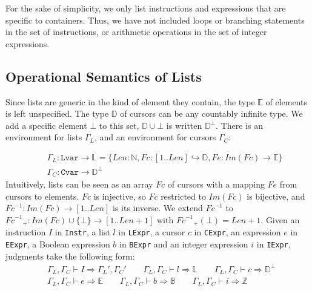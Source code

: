 \documentclass[runningheads,a4paper]{llncs}
\newcommand{\envL}{\ensuremath{\Gamma_L}\xspace}
\newcommand{\envC}{\ensuremath{\Gamma_C}\xspace}
\newcommand{\eval}{\envL, \envC \vdash}
\newcommand{\Fc}{\ensuremath{\mathit{Fc}}\xspace}
\newcommand{\FcInv}{\ensuremath{\mathit{Fc}^{-1}}\xspace}
\newcommand{\Fe}{\ensuremath{\mathit{Fe}}\xspace}
\newcommand{\ImFc}{\ensuremath{\mathit{Im}(\Fc)}\xspace}
\newcommand{\TypL}{\ensuremath{\mathbb{L}}\xspace}
\newcommand{\TypE}{\ensuremath{\mathbb{E}}\xspace}
\newcommand{\TypD}{\ensuremath{\mathbb{D}}\xspace}
\newcommand{\Nat}{\ensuremath{\mathbb{N}}\xspace}
\newcommand{\Int}{\ensuremath{\mathbb{Z}}\xspace}
\newcommand{\Bool}{\ensuremath{\mathbb{B}}\xspace}
\newcommand{\Len}{\ensuremath{\mathit{Len}}\xspace}
\newcommand{\beforesub}{\vspace{-0.2cm}}
\newcommand{\aftersub}{\vspace{-0.1cm}}
\begin{document}
For the sake of simplicity, we only list instructions and expressions that are
specific to containers. Thus, we have not included loops or branching
statements in the set of instructions, or arithmetic operations in the set of
integer expressions.

\beforesub
\subsection{Operational Semantics of Lists}
\aftersub

Since lists are generic in the kind of element they contain, the type \TypE of
elements is left unspecified. The type \TypD of cursors can be any countably infinite type.
We add a specific element $\bot$ to this set, $\TypD\cup\bot$ is written $\TypD^\bot$.
There is an environment for lists \envL, and an
environment for cursors \envC:

\begin{eqnarray*}
&&\envL : \texttt{Lvar} \rightarrow \TypL = \{\Len
: \Nat, \Fc : [1 .. \Len] \hookrightarrow \TypD, \Fe : \ImFc
\rightarrow \TypE\} \\
&&\envC : \texttt{Cvar} \rightarrow \TypD^\bot
\end{eqnarray*}
Intuitively, lists can be seen as an array $\Fc$ of cursors with a mapping
$\Fe$ from cursors to elements. \Fc is injective, so \Fc restricted to \ImFc is
bijective, and $\FcInv:\ImFc \rightarrow[1 .. \Len]$ is its inverse. We
extend \FcInv to $\FcInv_+: \ImFc\cup \{\bot\} \rightarrow [1 .. \Len+1]$
with $\FcInv_+(\bot)=\Len+1$.
Given an instruction $I$ in \texttt{Instr}, a list $l$ in \texttt{LExpr}, a
cursor $c$ in \texttt{CExpr}, an expression $e$ in \texttt{EExpr}, a Boolean
expression $b$ in \texttt{BExpr} and an integer expression $i$ in
\texttt{IExpr}, judgments take the following form:
\begin{eqnarray*}
&\eval I \Rightarrow \envL',\envC' 
\qquad \eval l \Rightarrow \TypL
\qquad \eval c \Rightarrow \TypD^\bot\\
&\eval e \Rightarrow \TypE
\qquad \eval b \Rightarrow\Bool
\qquad \eval i \Rightarrow\Int
\end{eqnarray*}
\end{document}
